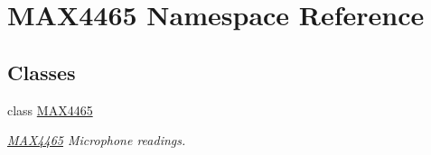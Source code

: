 \hypertarget{namespace_m_a_x4465}{}\section{M\+A\+X4465 Namespace Reference}
\label{namespace_m_a_x4465}
\subsection*{Classes}
\begin{DoxyCompactItemize}
\item 
class \mbox{\hyperlink{class_m_a_x4465_1_1_m_a_x4465}{M\+A\+X4465}}
\begin{DoxyCompactList}\small\item\em \mbox{\hyperlink{class_m_a_x4465_1_1_m_a_x4465}{M\+A\+X4465}} Microphone readings. \end{DoxyCompactList}\end{DoxyCompactItemize}
